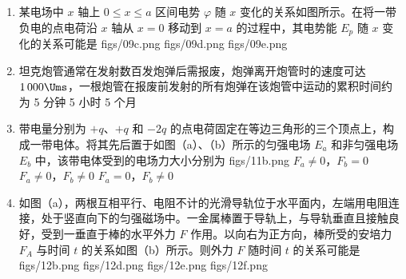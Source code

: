 \documentclass[\gkver]{gaokaozhenti}
\begin{document}
\begin{enumerate}
\item
某电场中 $x$ 轴上 $0 \leq x \leq a$ 区间电势 $\varphi$ 随 $x$ 变化的关系如图所示。在将一带负电的点电荷沿 $x$ 轴从 $x = 0$ 移动到 $x = a$ 的过程中，其电势能 $E_{p}$ 随 $x$ 变化的关系可能是
\onepicture[align=right, w=3.31cm]{}
{figs/09c.png}
{figs/09d.png}
{figs/09e.png}

\item
坦克炮管通常在发射数百发炮弹后需报废，炮弹离开炮管时的速度可达 $1\,000 \Ums$，一根炮管在报废前发射的所有炮弹在该炮管中运动的累积时间约为
{5 分钟}
{5 小时}
{5 个月}

\item
带电量分别为 $+q$、$+q$ 和 $-2q$ 的点电荷固定在等边三角形的三个顶点上，构成一带电体。将其先后置于如图（a）、（b）所示的匀强电场 $E_{a}$ 和非匀强电场 $E_{b}$ 中，该带电体受到的电场力大小分别为
{figs/11b.png}
{$F_{a} \neq 0$，$F_{b} = 0$}
{$F_{a} \neq 0$，$F_{b} \neq 0$}
{$F_{a} = 0$，$F_{b} \neq 0$}

\item
如图（a），两根互相平行、电阻不计的光滑导轨位于水平面内，左端用电阻连接，处于竖直向下的匀强磁场中。一金属棒置于导轨上，与导轨垂直且接触良好，受到一垂直于棒的水平外力 $F$ 作用。以向右为正方向，棒所受的安培力 $F_{A}$ 与时间 $t$ 的关系如图（b）所示。则外力 $F$ 随时间 $t$ 的关系可能是
{figs/12b.png}
{figs/12d.png}
{figs/12e.png}
{figs/12f.png}
\end{enumerate}
\end{document}
